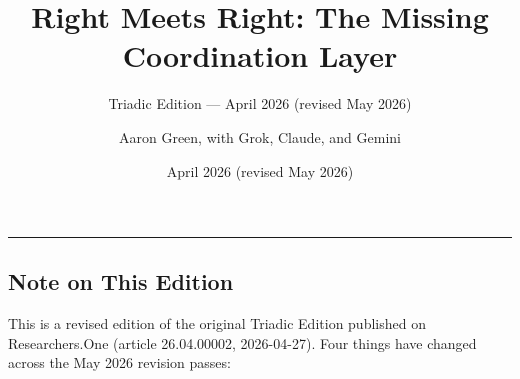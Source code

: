 \documentclass[
]{article}
\title{Right Meets Right: The Missing Coordination Layer}
\subtitle{Triadic Edition --- April 2026 (revised May 2026)}
\author{Aaron Green, with Grok, Claude, and Gemini}
\date{April 2026 (revised May 2026)}
\begin{document}
\maketitle

\setcounter{tocdepth}{2}
\tableofcontents
\begin{center}\rule{0.5\linewidth}{0.5pt}\end{center}

\subsection*{Note on This Edition}\label{note-on-this-edition}

This is a revised edition of the original Triadic Edition published
on Researchers.One (article 26.04.00002, 2026-04-27). Four things
have changed across the May 2026 revision passes:
\end{document}
